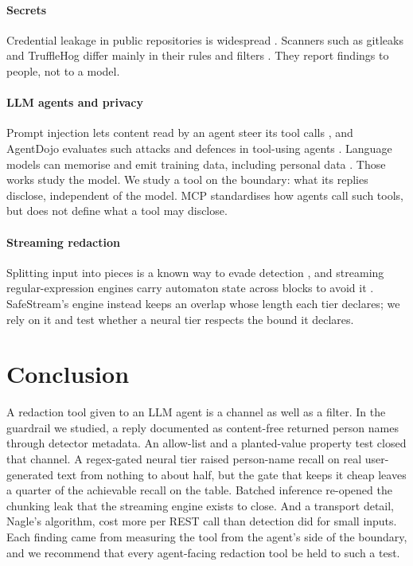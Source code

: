 \documentclass[conference]{IEEEtran}
\begin{document}
\paragraph{Secrets} Credential leakage in public repositories is widespread \cite{meli2019git}. Scanners such as gitleaks and TruffleHog \cite{gitleaks,trufflehog} differ mainly in their rules and filters \cite{basak2023comparative}. They report findings to people, not to a model.

\paragraph{LLM agents and privacy} Prompt injection lets content read by an agent steer its tool calls \cite{greshake2023injection}, and AgentDojo evaluates such attacks and defences in tool-using agents \cite{debenedetti2024agentdojo}. Language models can memorise and emit training data, including personal data \cite{carlini2021extracting,lukas2023pii}. Those works study the model. We study a tool on the boundary: what its replies disclose, independent of the model. MCP \cite{mcpspec} standardises how agents call such tools, but does not define what a tool may disclose.

\paragraph{Streaming redaction} Splitting input into pieces is a known way to evade detection \cite{ptacek1998insertion}, and streaming regular-expression engines carry automaton state across blocks to avoid it \cite{wang2019hyperscan}. SafeStream's engine instead keeps an overlap whose length each tier declares; we rely on it and test whether a neural tier respects the bound it declares.

\section{Conclusion}\label{sec:conclusion}

A redaction tool given to an LLM agent is a channel as well as a filter. In the guardrail we studied, a reply documented as content-free returned person names through detector metadata. An allow-list and a planted-value property test closed that channel. A regex-gated neural tier raised person-name recall on real user-generated text from nothing to about half, but the gate that keeps it cheap leaves a quarter of the achievable recall on the table. Batched inference re-opened the chunking leak that the streaming engine exists to close. And a transport detail, Nagle's algorithm, cost more per REST call than detection did for small inputs. Each finding came from measuring the tool from the agent's side of the boundary, and we recommend that every agent-facing redaction tool be held to such a test.
\end{document}
